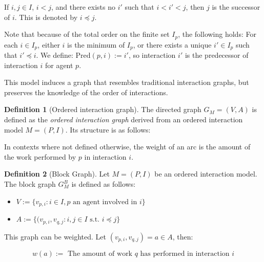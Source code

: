 \documentclass[a4paper,11pt]{book}
\newcommand{\pred}{\mathrm{Pred}}
\theoremstyle{definition}
\newtheorem{definition}{Definition}
\begin{document}
If $i, j \in I$, $i < j$, and there exists no $i'$ such that $i < i' < j$, then
$j$ is the successor of $i$. This is denoted by $i \preceq j$.

Note that because of the total order on the finite set $I_p$, the following holds:
For each $i \in I_p$, either $i$ is the minimum of $I_p$, or there exists
a unique $i' \in I_p$ such that $i' \preceq i$. 
We define: $\pred(p, i) := i'$, so interaction $i'$ is the predecessor
of interaction $i$ for agent $p$. 

  
This model induces a graph that resembles traditional interaction graphs, but preserves the knowledge
of the order of interactions.
\begin{definition}[Ordered interaction graph]
    The directed graph $G_M = (V, A)$ is defined as the \emph{ordered interaction graph} derived from an ordered interaction model $M = (P,I)$.
    Its structure is as follows:


    In contexts where not defined otherwise, the weight of an arc is the amount of the work performed by $p$ in
    interaction $i$. 
\end{definition}


\begin{definition}[Block Graph]
    Let $M = (P, I)$ be an ordered interaction model. The block graph $G^B_{M}$ is defined as follows:

    \begin{itemize}
        \item $V := \{ v_{p, i} : i \in I, p \mbox{ an agent involved in } i \}$\\
        \item $A := \{ (v_{p,i}, v_{q,j} : i, j \in I \mbox{ s.t. } i \preceq j \}$\\
    \end{itemize}

    This graph can be weighted. Let $(v_{p,i}, v_{q, j}) = a \in A$, then:

    \begin{equation*}
        w(a) := \mbox{ The amount of work } q \mbox{ has performed in interaction } i 
    \end{equation*}
\end{definition}
\end{document}
